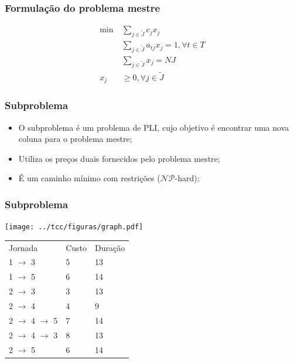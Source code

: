 \documentclass{beamer}
\begin{document}
\begin{frame}
    \frametitle{Formulação do problema mestre}

    \begin{subequations}
        \label{pmaster}
        \begin{align}
            \label{pmaster1}  \text{min} \: &\sum_{j \in \tilde{J}} c_j x_j \\
            \label{pmaster2} &\sum_{j \in \tilde{J}} a_{tj} x_j = 1, \forall t \in T \\
            \label{pmaster3} &\sum_{j \in \tilde{J}}        x_j = NJ \\
            \label{pmaster4} x_j &\geq 0, \forall j \in \tilde{J}
        \end{align}
    \end{subequations}
\end{frame}

\begin{frame}
    \frametitle{Subproblema}


    \begin{itemize}
        \item O subproblema é um problema de PLI, cujo objetivo é encontrar uma nova coluna para o problema mestre;
        \item Utiliza os preços duais fornecidos pelo problema mestre;
        \item É um caminho mínimo com restrições ($\mathcal{NP}$-hard);
    \end{itemize}
\end{frame}

\begin{frame}
    \frametitle{Subproblema}
{
    \centering
    \begin{minipage}{.48\textwidth}
        \centering
        \texttt{[image: ../tcc/figuras/graph.pdf]}
        \label{treta}
    \end{minipage}%
    \begin{minipage}{0.48\textwidth}
        \centering
        \begin{tabular}{l l l}
            Jornada                           & Custo & Duração \\
            1 $\rightarrow$ 3                 & 5     & 13 \\
            1 $\rightarrow$ 5                 & 6     & 14 \\
            2 $\rightarrow$ 3                 & 3     & 13 \\
            2 $\rightarrow$ 4                 & 4     & 9  \\
            2 $\rightarrow$ 4 $\rightarrow$ 5 & 7     & 14 \\
            2 $\rightarrow$ 4 $\rightarrow$ 3 & 8     & 13 \\
            2 $\rightarrow$ 5                 & 6     & 14 \\
        \end{tabular}
        \label{tab_gragh_csp_enum}
    \end{minipage}
}
\end{frame}
\end{document}
